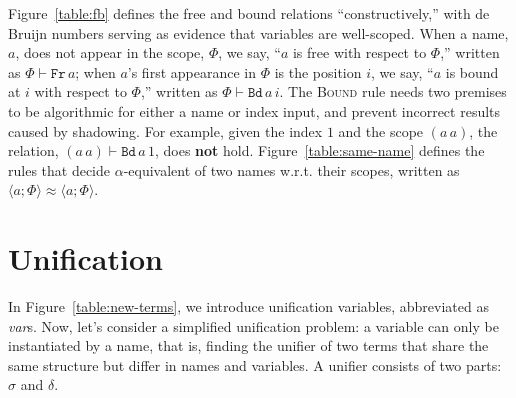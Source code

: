 \documentclass{easychair}
\newcommand{\clos}[2] {
\langle #1; #2 \rangle
}
\newcommand{\aeq}[4] {
\clos{#1}{#2} \approx \clos{#3}{#4}
}
\newcommand*{\transname}[1]{\textsc{#1}}
\begin{document}
Figure~\ref{table:fb} defines the free and bound relations
``constructively,'' with de Bruijn numbers serving as
evidence that variables are well-scoped. When a name, $a$, does not
appear in the scope, $\Phi$, we say, ``$a$ is free with respect to
$\Phi$,'' written as $\Phi \vdash \texttt{Fr}\, a$; when $a$'s first
appearance in $\Phi$ is the position $i$, we say, ``$a$ is bound at
$i$ with respect to $\Phi$,'' written as $\Phi \vdash \texttt{Bd}\,
a\,i$. The \transname{Bound} rule needs two premises to be algorithmic
for either a name or index input,
and prevent incorrect results caused by shadowing.
For example, given the index $1$ and the scope $(a\,a)$,
the relation, $(a\,a) \vdash \texttt{Bd}\,a\,1$, does \textbf{not} hold.
Figure~\ref{table:same-name} defines the rules that decide
$\alpha$-equivalent of two names w.r.t. their scopes, written as
$\aeq{a}{\Phi}{a}{\Phi}$. 

\section{Unification}
\label{unify}
In Figure~\ref{table:new-terms}, we introduce unification variables,
abbreviated as \emph{var}s. Now, let's consider a simplified
unification problem: a variable can only be instantiated by a name, that is,
finding the unifier of two terms that share the same structure but
differ in names and variables. A unifier consists of two parts:
$\sigma$ and $\delta$.
\end{document}
